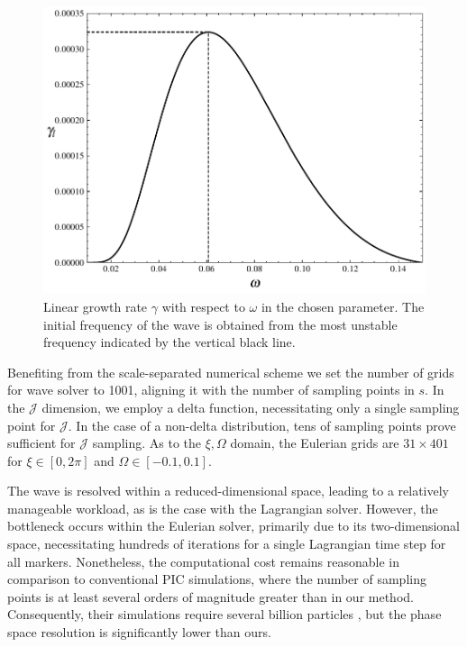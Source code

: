 \begin{figure}[htbp]
    \centering
    \includegraphics[scale=0.5]{cpc_img/fig_gamma1d.pdf}
    \caption{Linear growth rate $\gamma$ with respect to $\omega$ in the chosen parameter. The initial frequency of the wave is obtained from the most unstable frequency indicated by the vertical black line.}
    \label{fig.para}
\end{figure}

Benefiting from the scale-separated numerical scheme we set the number of grids for wave solver to 1001, aligning it with the number of sampling points in $s$.
In the $\mathcal{J}$ dimension, we employ a delta function, necessitating only a single sampling point for $\mathcal{J}$. In the case of a non-delta distribution, tens of sampling points prove sufficient for $\mathcal{J}$ sampling.
As to the $\xi,\Omega$ domain, the Eulerian grids are $31 \times 401$ for $\xi \in [0,2\pi]$ and $\Omega \in [-0.1,0.1]$.

The wave is resolved within a reduced-dimensional space, leading to a relatively manageable workload, as is the case with the Lagrangian solver. However, the bottleneck occurs within the Eulerian solver, primarily due to its two-dimensional space, necessitating hundreds of iterations for a single Lagrangian time step for all markers. Nonetheless, the computational cost remains reasonable in comparison to conventional PIC simulations, where the number of sampling points is at least several orders of magnitude greater than in our method. Consequently, their simulations require several billion particles \cite{nogi2022,katoh2016}, but the phase space resolution is significantly lower than ours.

